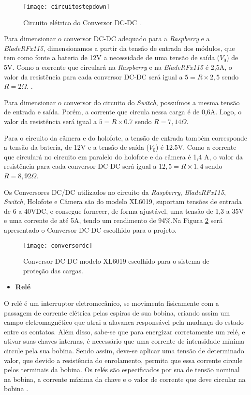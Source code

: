 \begin{figure}[H]
\centering
\texttt{[image: circuitostepdown]}
    \caption{Circuito elétrico do Conversor DC-DC \cite{Amauri}.}
\label{fig:circuitostepdown}
\end{figure}
\FloatBarrier

Para dimensionar o conversor DC-DC adequado para a \textit{Raspberry} e a \textit{BladeRFx115}, dimensionamos a partir da tensão de entrada dos módulos, que tem como fonte a bateria de 12V a necessidade de uma tensão de saída ($V_0$) de 5V. Como a corrente que circulará na \textit{Raspberry} e na \textit{BladeRFx115} é 2,5A, o valor da resistência para cada conversor DC-DC será igual a $5=R \times 2,5$ sendo $R= 2 \Omega$. \cite{MSM}.

Para dimensionar o conversor do circuito do \textit{Switch}, possuímos a mesma tensão de entrada e saída. Porém, a corrente que circula nessa carga é de 0,6A. Logo, o valor da resistência será igual a $5=R \times 0.7$ sendo $R= 7,14 \Omega$.

Para o circuito da câmera e do holofote, a tensão de entrada também corresponde a tensão da bateria, de 12V e a tensão de saída ($V_0$) é 12.5V. Como a corrente que circulará no circuito em paralelo do holofote e da câmera é 1,4 A, o valor da resistência para cada conversor DC-DC será igual a $12,5=R \times 1,4$ sendo $R= 8,92 \Omega$.

Os Conversores DC/DC utilizados no circuito da \textit{Raspberry}, \textit{BladeRFx115}, \textit{Switch}, Holofote e Câmera são do modelo XL6019, suportam tensões de entrada de 6 a 40VDC, e consegue fornecer, de forma ajustável, uma tensão de 1,3 a 35V e uma corrente de até 5A, tendo um rendimento de 94\%.Na Figura \ref{fig:conversordc} será apresentado o Conversor DC-DC escolhido para o projeto.

\begin{figure}[H]
\centering
\texttt{[image: conversordc]}
    \caption{Conversor DC-DC modelo XL6019 escolhido para o sistema de proteção das cargas.}
\label{fig:conversordc}
\end{figure}
\FloatBarrier


\begin{itemize}

    \item \textbf{Relé}
    
\end{itemize}

O relé é um interruptor eletromecânico, se movimenta fisicamente com a passagem de corrente elétrica pelas espiras de sua bobina, criando assim um campo eletromagnético que atrai a alavanca responsável pela mudança do estado entre os contatos. Além disso, sabe-se que para energizar corretamente um relé, e ativar suas chaves internas, é necessário que uma corrente de intensidade mínima circule pela sua bobina. Sendo assim, deve-se aplicar uma tensão de determinado valor, que devido a resistência do enrolamento, permita que essa corrente circule pelos terminais da bobina. Os relés são especificados por sua de tensão nominal na bobina, a corrente máxima da chave e o valor de corrente que deve circular na bobina \cite{Braga}.

